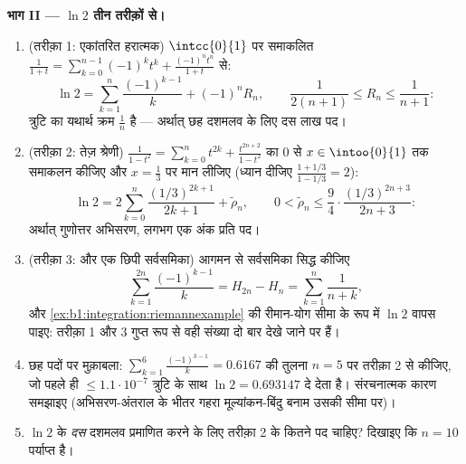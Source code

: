 \begin{problem}
\medskip \noindent\textbf{भाग II --- $\ln 2$ तीन तरीक़ों से।}
\begin{enumerate}[resume]
  \item (तरीक़ा 1: एकांतरित हरात्मक) $\intcc{0}{1}$ पर समाकलित
  $\frac{1}{1+t} = \sum_{k=0}^{n-1}(-1)^k t^k + \frac{(-1)^n t^n}{1+t}$ से:
        \[
        \ln 2 = \sum_{k=1}^{n} \frac{(-1)^{k-1}}{k} + (-1)^n
        R_n, \qquad \frac{1}{2(n+1)} \leq R_n \leq
        \frac{1}{n+1} :
        \]
        त्रुटि का यथार्थ क्रम $\frac 1n$ है --- अर्थात् छह दशमलव के लिए दस
        लाख पद।
  \item (तरीक़ा 2: तेज़ श्रेणी) $\frac{1}{1 - t^2} = \sum_{k=0}^{n} t^{2k} +
  \frac{t^{2n+2}}{1-t^2}$ का $0$ से $x \in \intoo{0}{1}$ तक समाकलन कीजिए और
  $x = \frac13$ पर मान लीजिए (ध्यान दीजिए $\frac{1 + 1/3}{1 - 1/3} = 2$):
        \[
        \ln 2 = 2\sum_{k=0}^{n} \frac{(1/3)^{2k+1}}{2k+1} +
        \tilde\rho_n,
        \qquad
        0 < \tilde\rho_n \leq \frac{9}{4}\cdot
        \frac{(1/3)^{2n+3}}{2n+3} :
        \]
        अर्थात् गुणोत्तर अभिसरण, लगभग एक अंक प्रति पद।
  \item (तरीक़ा 3:  और एक छिपी सर्वसमिका) आगमन से सर्वसमिका सिद्ध
  कीजिए
        \[
        \sum_{k=1}^{2n} \frac{(-1)^{k-1}}{k} = H_{2n} - H_n =
        \sum_{k=1}^{n} \frac{1}{n + k} ,
        \]
        और \cref{ex:b1:integration:riemannexample} की रीमान-योग सीमा के रूप
        में $\ln 2$ वापस पाइए: तरीक़ा 1 और 3 गुप्त रूप से वही संख्या दो बार
        देखे जाने पर हैं।
  \item छह पदों पर मुक़ाबला: $\sum_{k=1}^{6} \frac{(-1)^{k-1}}{k} = 0.6167$
  की तुलना $n = 5$ पर तरीक़ा 2 से कीजिए, जो पहले ही $\leq 1.1\cdot10^{-7}$
  त्रुटि के साथ $\ln 2 = 0.693147$ दे देता है। संरचनात्मक कारण समझाइए
  (अभिसरण-अंतराल के भीतर गहरा मूल्यांकन-बिंदु बनाम उसकी सीमा पर)।
  \item $\ln 2$ के \emph{दस} दशमलव प्रमाणित करने के लिए तरीक़ा 2 के कितने पद
  चाहिए? दिखाइए कि $n = 10$ पर्याप्त है।
\end{enumerate}


\end{problem}

